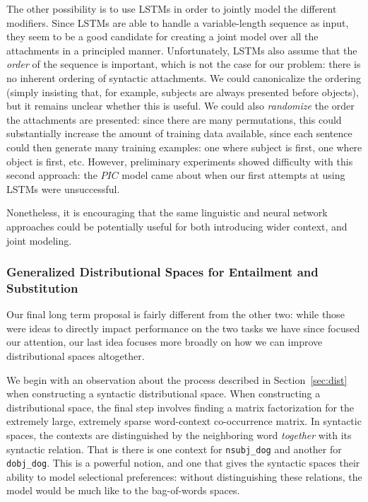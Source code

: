 \documentclass[12pt]{article}
\begin{document}
The other possibility is to use LSTMs in order to jointly model the different
modifiers. Since LSTMs are able to handle a variable-length sequence as input,
they seem to be a good candidate for creating a joint model over all the
attachments in a principled manner. Unfortunately, LSTMs also assume that the
{\em order} of the sequence is important, which is not the case for our problem:
there is no inherent ordering of syntactic attachments. We could canonicalize
the ordering (simply insisting that, for example, subjects are always presented
before objects), but it remains unclear whether this is useful. We could also
{\em randomize} the order the attachments are presented: since there are many
permutations, this could substantially increase the amount of training data
available, since each sentence could then generate many training examples: one
where subject is first, one where object is first, etc. However, preliminary
experiments showed difficulty with this second approach: the $PIC$ model came
about when our first attempts at using LSTMs were unsuccessful.

Nonetheless, it is encouraging that the same linguistic and neural network
approaches could be potentially useful for both introducing wider context,
and joint modeling.

\subsubsection{Generalized Distributional Spaces for Entailment and Substitution}

Our final long term proposal is fairly different from the other two: while
those were ideas to directly impact performance on the two tasks we have
since focused our attention, our last idea focuses more broadly on how
we can improve distributional spaces altogether.

We begin with an observation about the process described in
Section~\ref{sec:dist} when constructing a syntactic distributional space.
When constructing a distributional space, the final step involves finding a
matrix factorization for the extremely large, extremely sparse word-context
co-occurrence matrix. In syntactic spaces, the contexts are distinguished by
the neighboring word {\em together} with its syntactic relation. That is there
is one context for {\tt nsubj\_dog} and another for {\tt dobj\_dog}. This is a
powerful notion, and one that gives the syntactic spaces their ability
to model selectional preferences: without distinguishing these relations,
the model would be much like to the bag-of-words spaces.
\end{document}
